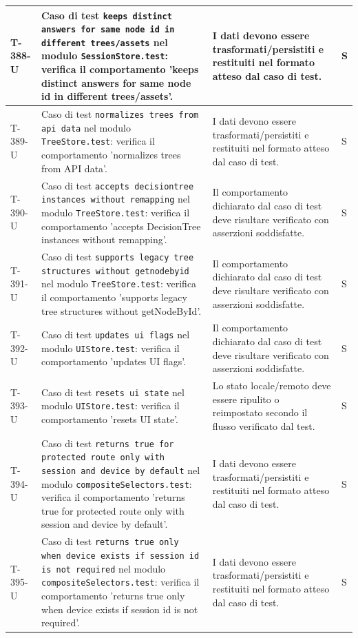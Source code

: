 \documentclass[a4paper,12pt]{article}
\begin{document}
{{\begin{longtable}{|>{\RaggedRight\arraybackslash}p{1.55cm}|>{\RaggedRight\arraybackslash}p{8.0cm}|>{\RaggedRight\arraybackslash}p{4.6cm}|>{\RaggedRight\arraybackslash}p{1.2cm}|}
        \hline
        T-388-U & Caso di test \texttt{keeps distinct answers for same node id in different trees/assets} nel modulo \texttt{SessionStore.test}: verifica il comportamento 'keeps distinct answers for same node id in different trees/assets'. & I dati devono essere trasformati/persistiti e restituiti nel formato atteso dal caso di test. & S \\
        \hline
        T-389-U & Caso di test \texttt{normalizes trees from api data} nel modulo \texttt{TreeStore.test}: verifica il comportamento 'normalizes trees from API data'. & I dati devono essere trasformati/persistiti e restituiti nel formato atteso dal caso di test. & S \\
        \hline
        T-390-U & Caso di test \texttt{accepts decisiontree instances without remapping} nel modulo \texttt{TreeStore.test}: verifica il comportamento 'accepts DecisionTree instances without remapping'. & Il comportamento dichiarato dal caso di test deve risultare verificato con asserzioni soddisfatte. & S \\
        \hline
        T-391-U & Caso di test \texttt{supports legacy tree structures without getnodebyid} nel modulo \texttt{TreeStore.test}: verifica il comportamento 'supports legacy tree structures without getNodeById'. & Il comportamento dichiarato dal caso di test deve risultare verificato con asserzioni soddisfatte. & S \\
        \hline
        T-392-U & Caso di test \texttt{updates ui flags} nel modulo \texttt{UIStore.test}: verifica il comportamento 'updates UI flags'. & Il comportamento dichiarato dal caso di test deve risultare verificato con asserzioni soddisfatte. & S \\
        \hline
        T-393-U & Caso di test \texttt{resets ui state} nel modulo \texttt{UIStore.test}: verifica il comportamento 'resets UI state'. & Lo stato locale/remoto deve essere ripulito o reimpostato secondo il flusso verificato dal test. & S \\
        \hline
        T-394-U & Caso di test \texttt{returns true for protected route only with session and device by default} nel modulo \texttt{compositeSelectors.test}: verifica il comportamento 'returns true for protected route only with session and device by default'. & I dati devono essere trasformati/persistiti e restituiti nel formato atteso dal caso di test. & S \\
        \hline
        T-395-U & Caso di test \texttt{returns true only when device exists if session id is not required} nel modulo \texttt{compositeSelectors.test}: verifica il comportamento 'returns true only when device exists if session id is not required'. & I dati devono essere trasformati/persistiti e restituiti nel formato atteso dal caso di test. & S \\

\end{longtable}}}
\end{document}
